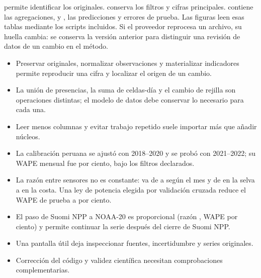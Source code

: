  permite identificar los originales.
 conserva los filtros y cifras principales.
 contiene las agregaciones, y
, las predicciones y errores de prueba. Las figuras leen
esas tablas mediante los scripts incluidos. Si el proveedor reprocesa un archivo, su huella cambia:
se conserva la versión anterior para distinguir una revisión de datos de un cambio
en el método.

\resumen
\begin{itemize}
\item Preservar originales, normalizar observaciones y materializar indicadores permite
reproducir una cifra y localizar el origen de un cambio.
\item La unión de presencias, la suma de celdas-día y el cambio de rejilla son operaciones
distintas; el modelo de datos debe conservar lo necesario para cada una.
\item Leer menos columnas y evitar trabajo repetido suele importar más que añadir núcleos.
\item La calibración peruana se ajustó con 2018--2020 y se probó con 2021--2022; su WAPE
mensual fue \PeruWAPE{} por ciento, bajo los filtros declarados.
\item La razón entre sensores no es constante: va de \PeruRazonMin{} a \PeruRazonMax{} según
el mes y de \RegSelvaRazon{} en la selva a \RegCostaRazon{} en la costa. Una ley de potencia
elegida por validación cruzada reduce el WAPE de prueba a \PeruPotWAPE{} por ciento.
\item El paso de Suomi NPP a NOAA-20 es proporcional (razón \NveinteRazon, WAPE
\NveinteWapeRazon{} por ciento) y permite continuar la serie después del cierre de Suomi NPP.
\item Una pantalla útil deja inspeccionar fuentes, incertidumbre y series originales.
\item Corrección del código y validez científica necesitan comprobaciones complementarias.
\end{itemize}

